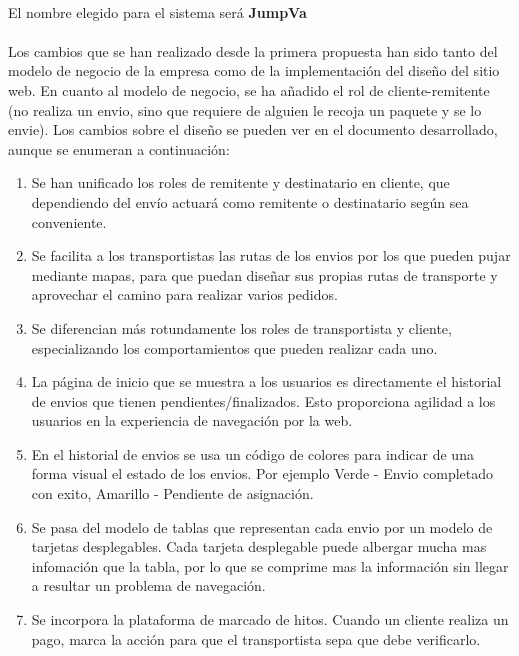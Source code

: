 \documentclass[10pt, a4paper,spanish]{article}
\begin{document}
		\paragraph{}
		El nombre elegido para el sistema será \textbf{JumpVa}

		\paragraph{}
		Los cambios que se han realizado desde la primera propuesta han sido tanto del modelo de negocio de la empresa como de la implementación del diseño del sitio web. En cuanto al modelo de negocio, se ha añadido el rol de cliente-remitente (no realiza un envio, sino que requiere de alguien le recoja un paquete y se lo envie). Los cambios sobre el diseño se pueden ver en el documento desarrollado, aunque se enumeran a continuación:

			\begin{enumerate}
				\item Se han unificado los roles de remitente y destinatario en cliente, que dependiendo del envío actuará como remitente o destinatario según sea conveniente.

				\item Se facilita a los transportistas las rutas de los envios por los que pueden pujar mediante mapas, para que puedan diseñar sus propias rutas de transporte y aprovechar el camino para realizar varios pedidos.

				\item Se diferencian más rotundamente los roles de transportista y cliente, especializando los comportamientos que pueden realizar cada uno.

				\item La página de inicio que se muestra a los usuarios es directamente el historial de envios que tienen pendientes/finalizados. Esto proporciona agilidad a los usuarios en la experiencia de navegación por la web.

				\item En el historial de envios se usa un código de colores para indicar de una forma visual el estado de los envios. Por ejemplo Verde - Envio completado con exito, Amarillo - Pendiente de asignación.

				\item Se pasa del modelo de tablas que representan cada envio por un modelo de tarjetas desplegables. Cada tarjeta desplegable puede albergar mucha mas infomación que la tabla, por lo que se comprime mas la información sin llegar a resultar un problema de navegación.

				\item Se incorpora la plataforma de marcado de hitos. Cuando un cliente realiza un pago, marca la acción para que el transportista sepa que debe verificarlo.
			\end{enumerate}
\end{document}
